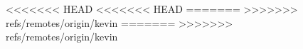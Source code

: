 \documentclass{nature}
\begin{document}
{\begin{figure}[tb]
<<<<<<< HEAD
<<<<<<< HEAD
=======
>>>>>>> refs/remotes/origin/kevin
=======
>>>>>>> refs/remotes/origin/kevin
%

\end{figure}}
\end{document}
